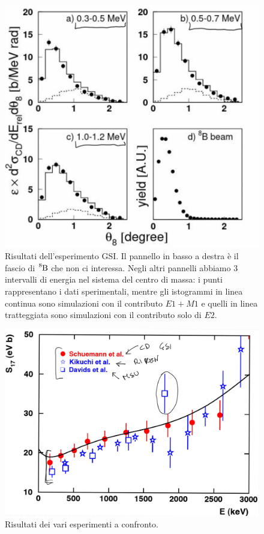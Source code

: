\begin{figure}[h]
	\centering
	\includegraphics[scale=0.5]{Immagini/0419_ang.png}
	\caption{Risultati dell'esperimento GSI. Il pannello in basso a destra è il fascio di $\ce{^8B}$ che non ci interessa. Negli altri pannelli abbiamo 3 intervalli di energia nel sistema del centro di massa: i punti rappresentano i dati sperimentali, mentre gli istogrammi in linea continua sono simulazioni con il contributo $E1+M1$ e quelli in linea tratteggiata sono simulazioni con il contributo solo di $E2$.}
	\label{0419_gsi}
\end{figure}

\begin{figure}[!h]
	\centering
	\includegraphics[scale=0.5]{Immagini/0419_Sastr.png}
	\caption{Risultati dei vari esperimenti a confronto.}
	\label{0419_esp}
\end{figure}

